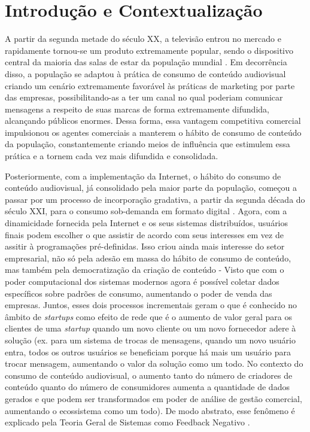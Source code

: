 \documentclass[11pt]{article}
\begin{document}
\section{Introdução e Contextualização} \label{sec:Introducao}

A partir da segunda metade do século XX, a televisão entrou no mercado e  rapidamente tornou-se um produto extremamente popular, sendo o dispositivo central da maioria das salas de estar da população mundial \cite{kuchta_miklosik_2017}.
%
Em decorrência disso, a população se adaptou à prática de consumo de conteúdo audiovisual criando um cenário extremamente favorável às práticas de marketing por parte das empresas, possibilitando-as a ter um canal no qual poderiam comunicar mensagens a respeito de suas marcas de forma extremamente difundida, alcançando públicos enormes. 
%
Dessa forma, essa vantagem competitiva comercial impulsionou os agentes comerciais a manterem o hábito de consumo de conteúdo da população, constantemente criando meios de influência que estimulem essa prática e a tornem cada vez mais difundida e consolidada.

Posteriormente, com a implementação da Internet, o hábito do consumo de conteúdo audiovisual, já consolidado pela maior parte da população, começou a passar por um processo de incorporação gradativa, a partir da segunda década do século XXI, para o consumo sob-demanda em formato digital \cite{tefertiller2018media}.
%
Agora, com a dinamicidade fornecida pela Internet e os seus sistemas distribuídos, usuários finais podem escolher o que assistir de acordo com seus interesses em vez de assitir à programações pré-definidas.
%
Isso criou ainda mais interesse do setor empresarial, não só pela adesão em massa do hábito de consumo de conteúdo, mas também pela democratização da criação de conteúdo - Visto que com o poder computacional dos sistemas modernos agora é possível coletar dados específicos sobre padrões de consumo, aumentando o poder de venda das empresas.
%
Juntos, esses dois processos incrementais geram o que é conhecido no âmbito de \textit{startups} como efeito de rede \cite{albourini2020effect} que é o aumento de valor geral para os clientes de uma \textit{startup} quando um novo cliente ou um novo fornecedor adere à solução (ex. para um sistema de trocas de mensagens, quando um novo usuário entra, todos os outros usuários se beneficiam porque há mais um usuário para trocar mensagem, aumentando o valor da solução como um todo. No contexto do consumo de conteúdo audiovisual, o aumento tanto do número de criadores de conteúdo quanto do número de consumidores aumenta a quantidade de dados gerados e que podem ser transformados em poder de análise de gestão comercial, aumentando o ecossistema como um todo). De modo abstrato, esse fenômeno é explicado pela Teoria Geral de Sistemas como Feedback Negativo \cite{bertalanffy1968}.
\end{document}
